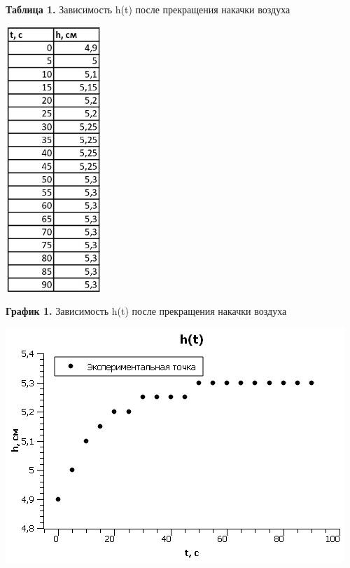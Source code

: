 \documentclass[15pt,a5paper,reqno]{article}
\begin{document}
    \noindent\textbf{Таблица 1.} Зависимость h(t) после прекращения накачки воздуха\\
    \begin{center}
        \includegraphics[height = 10cm]{Таблица 1.jpg}
    \end{center}
    
    \newpage
    \noindent\textbf{График 1.} Зависимость h(t) после прекращения накачки воздуха\\
    \begin{center}
        \includegraphics[]{График 1.jpg}
    \end{center}
    
\end{document}
